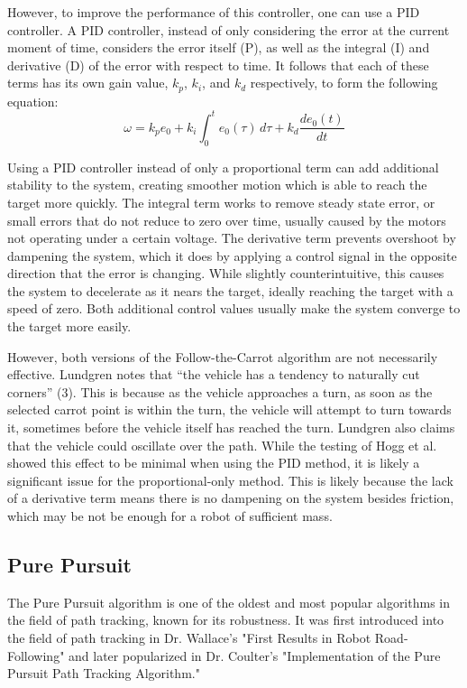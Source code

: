 \documentclass[12pt]{article}
\begin{document}
\begin{flushleft}
However, to improve the performance of this controller, one can use a PID controller. A PID controller, instead of only considering the error at the current moment of time, considers the error itself (P), as well as the integral (I) and derivative (D) of the error with respect to time. It follows that each of these terms has its own gain value, $k_p$, $k_i$, and $k_d$ respectively, to form the following equation:
\begin{equation}
\omega = k_p e_0 + k_i \int_0^t \! e_0(\tau) \, d\tau + k_d \frac{de_0(t)}{dt}
\end{equation}

Using a PID controller instead of only a proportional term can add additional stability to the system, creating smoother motion which is able to reach the target more quickly. The integral term works to remove steady state error, or small errors that do not reduce to zero over time, usually caused by the motors not operating under a certain voltage. The derivative term prevents overshoot by dampening the system, which it does by applying a control signal in the opposite direction that the error is changing. While slightly counterintuitive, this causes the system to decelerate as it nears the target, ideally reaching the target with a speed of zero. Both additional control values usually make the system converge to the target more easily.

However, both versions of the Follow-the-Carrot algorithm are not necessarily effective. Lundgren notes that ``the vehicle has a tendency to naturally cut corners'' (3). This is because as the vehicle approaches a turn, as soon as the selected carrot point is within the turn, the vehicle will attempt to turn towards it, sometimes before the vehicle itself has reached the turn. Lundgren also claims that the vehicle could oscillate over the path. While the testing of Hogg et al. showed this effect to be minimal when using the PID method, it is likely a significant issue for the proportional-only method. This is likely because the lack of a derivative term means there is no dampening on the system besides friction, which may be not be enough for a robot of sufficient mass.

\subsection{Pure Pursuit}

The Pure Pursuit algorithm is one of the oldest and most popular algorithms in the field of path tracking, known for its robustness. It was first introduced into the field of path tracking in Dr. Wallace's "First Results in Robot Road-Following" and later popularized in Dr. Coulter's "Implementation of the Pure Pursuit Path Tracking Algorithm."


\end{flushleft}
\end{document}

